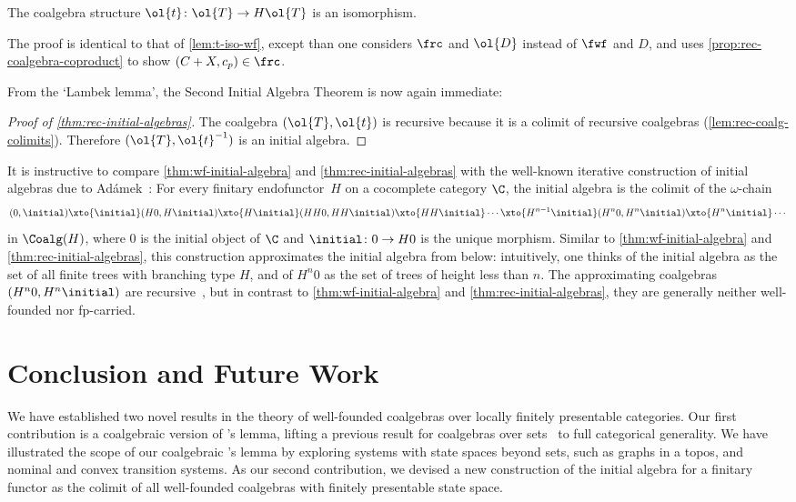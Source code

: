 \documentclass[a4paper,UKenglish, autoref, numberwithinsect, final]{lipics-v2021}
\numberwithin{equation}{section}
\theoremstyle{plain}
\theoremstyle{definition}
\begin{document}
\begin{lemma}\label{lem:t-iso}
The coalgebra structure $\ol{t}\colon \ol{T}\to H\ol{T}$ is an isomorphism.
\end{lemma}
The proof is identical to that of \autoref{lem:t-iso-wf}, except than one considers $\frc$ and $\ol{D}$ instead of $\fwf$ and $D$, and uses \autoref{prop:rec-coalgebra-coproduct} to show $(C+X,c_p)\in \frc$. 

From the `Lambek lemma', the Second Initial Algebra Theorem is now again immediate:

\begin{proof}[Proof of \autoref{thm:rec-initial-algebras}]
The coalgebra $(\ol{T},\ol{t})$ is recursive because it is a colimit of recursive coalgebras (\autoref{lem:rec-coalg-colimits}). Therefore $(\ol{T},\ol{t}^{-1})$ is an initial algebra.
\end{proof}

\begin{rem}
It is instructive to compare \autoref{thm:wf-initial-algebra} and \ref{thm:rec-initial-algebras} with the well-known iterative construction of initial algebras due to  Ad\'amek~\cite{adamek74}:
For every finitary endofunctor~$H$ on a cocomplete category $\C$, the initial algebra is the colimit of the $\omega$-chain
\[
(0,\initial)\xto{\smash{\initial}}
(H0,H\initial)\xto{\smash{H\initial}}
(HH0,HH\initial) \xto{\smash{HH\initial}}
\cdots \xto{\smash{H^{n-1}\initial}} 
(H^n0,H^n\initial)\xto{\smash{H^n\initial}} \cdots 
\]
in $\Coalg(H)$, where $0$ is the initial object of $\C$ and $\initial\colon 0\to H0$ is the unique morphism. Similar to \autoref{thm:wf-initial-algebra} and \ref{thm:rec-initial-algebras}, this construction approximates the initial algebra from below: intuitively, one thinks of the initial algebra as the set of all finite trees with branching type $H$, and of $H^n 0$ as the set of trees of height less than $n$. The approximating coalgebras $(H^n0,H^n\initial)$ are recursive~\cite[Prop.~6]{cuv06}, but in contrast to \autoref{thm:wf-initial-algebra} and \ref{thm:rec-initial-algebras}, they are generally neither well-founded nor fp-carried.
\end{rem}


\section{Conclusion and Future Work}
We have established two novel results in the theory of well-founded coalgebras over locally finitely presentable categories. Our first contribution is a coalgebraic version of \Konig's lemma, lifting a previous result for coalgebras over sets~\cite{amm25} to full categorical generality. We have illustrated the scope of our coalgebraic \Konig's lemma by exploring systems with state spaces beyond sets, such as graphs in a topos, and nominal and convex transition systems. As our second contribution, we devised a new construction of the initial algebra for a finitary functor as the colimit of all well-founded coalgebras with finitely presentable state space. 
\end{document}
